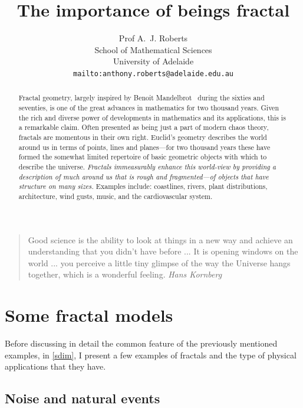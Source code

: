 \documentclass[11pt,a4paper]{article}
\title{The importance of beings fractal}
\author{Prof A.~J. Roberts\\
School of Mathematical Sciences\\
University of Adelaide\\
\texttt{mailto:anthony.roberts@adelaide.edu.au}
}
\begin{document}
\maketitle


\begin{quote}
	Good science is the ability to look at things in a new way and 
	achieve an understanding that you didn't have before ... It is opening 
	windows on the world ... you perceive a little tiny glimpse of the way 
	the Universe hangs together, which is a wonderful feeling.  \emph{Hans 
	Kornberg}~\cite{Korny}
\end{quote}

\begin{abstract}
	Fractal geometry, largely inspired by Benoit 
	Mandelbrot~\cite{Mandel} during the sixties and seventies, is one 
	of the great advances in mathematics for two thousand years.  
	Given the rich and diverse power of developments in mathematics 
	and its applications, this is a remarkable claim.  Often presented 
	as being just a part of modern chaos theory, fractals are 
	momentous in their own right.  Euclid's geometry describes the 
	world around us in terms of points, lines and planes---for two 
	thousand years these have formed the somewhat limited repertoire 
	of basic geometric objects with which to describe the universe.  
	\emph{Fractals immeasurably enhance this world-view by providing a 
	description of much around us that is rough and fragmented---of 
	objects that have structure on many sizes.} Examples include: 
	coastlines, rivers, plant distributions, architecture, wind gusts, 
	music, and the cardiovascular system.
\end{abstract}

\tableofcontents

\section{Some fractal models}
\label{sfrac}

Before discussing in detail the common feature of the previously 
mentioned examples, in \cref{sdim}, I present a few examples of 
fractals and the type of physical applications that they have.

\subsection{Noise and natural events}
\label{ssnoise}
\end{document}
